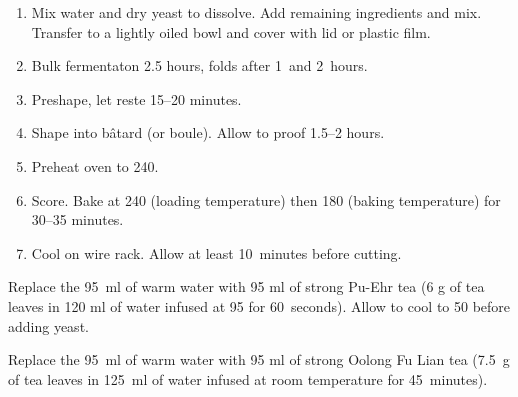 
\begin{ingredients}
\end{ingredients}


\begin{recipe}
  \begin{enumerate}

  \item Mix water and dry yeast to dissolve.  Add remaining
    ingredients and mix.  Transfer to a lightly oiled bowl and cover
    with lid or plastic film.
    
  \item Bulk fermentaton 2.5 hours, folds after 1~and 2~hours.
    
  \item Preshape, let reste 15--20 minutes.
    
  \item Shape into bâtard (or boule).  Allow to proof 1.5--2 hours.
    
  \item Preheat oven to 240\degreeC.
    
  \item Score.  Bake at 240\degreeC{} (loading temperature) then
    180\degreeC{} (baking temperature) for 30--35 minutes.

  \item Cool on wire rack.  Allow at least 10~minutes before cutting.
    
  \end{enumerate}
\end{recipe}


Replace the 95~ml of warm water with 95 ml of strong Pu-Ehr tea (6 g
of tea leaves in 120 ml of water infused at 95\degreeC{} for
60~seconds).  Allow to cool to 50\degreeC{} before adding yeast.


Replace the 95~ml of warm water with 95 ml of strong Oolong Fu Lian
tea (7.5~g of tea leaves in 125~ml of water infused at room
temperature for 45~minutes).

